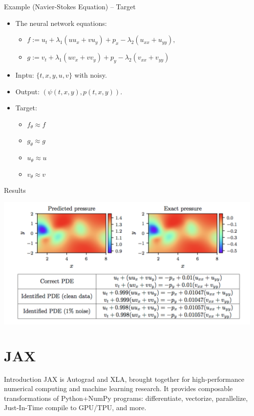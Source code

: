 \documentclass[aspectratio=1610,xcolor={dvipsnames},hyperref={colorlinks,unicode,linkcolor=violet,anchorcolor=BlueViolet,citecolor=YellowOrange,filecolor=black,urlcolor=Aquamarine}]{beamer}
\begin{document}
\begin{frame}[label={sec:org5b07541}]{Example (Navier-Stokes Equation) -- Target}
\begin{itemize}
\item The neural network equations:
\begin{itemize}
\item \(f := u_t + \lambda_1 (u u_x + v u_y) + p_x - \lambda_2(u_{xx} + u_{yy}),\)
\item \(g := v_t + \lambda_1 (u v_x + v v_y) + p_y - \lambda_2(v_{xx} + v_{yy})\)
\end{itemize}
\item Inptu: \(\{t,x,y,u,v\}\) with noisy.
\item Output: \((\psi(t, x, y), p(t, x, y))\).
\item Target:
\begin{itemize}
\item \(f_{\theta} \approx f\)
\item \(g_{\theta} \approx g\)
\item \(u_{\theta} \approx u\)
\item \(v_{\theta} \approx v\)
\end{itemize}
\end{itemize}
\end{frame}

\begin{frame}[label={sec:org5c27c39}]{Results}
\begin{center}
\includegraphics[width=.9\linewidth]{./p9.png}
\end{center}
\end{frame}

\section{JAX}
\label{sec:org207db80}

\begin{frame}[label={sec:org08699cc}]{Introduction}
JAX is Autograd and XLA, brought together for high-performance
numerical computing and machine learning research. It provides
composable transformations of Python+NumPy programs: differentiate,
vectorize, parallelize, Just-In-Time compile to GPU/TPU, and more.
\end{frame}
\end{document}

